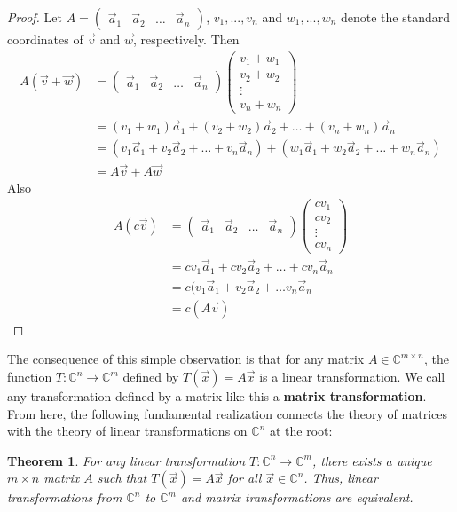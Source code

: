 \documentclass{article}
\theoremstyle{definition}
\theoremstyle{plain}
\theoremstyle{theorem}
\newtheorem{theorem}{Theorem}[section]
\begin{document}
\begin{proof}
	Let $A = \begin{pmatrix} \vec{a}_1 & \vec{a}_2 & \ldots & \vec{a}_n \end{pmatrix}$, $v_1,...,v_n$ and $w_1,...,w_n$ denote the standard coordinates of $\vec{v}$ and $\vec{w}$, respectively. Then
	\begin{align}
		A(\vec{v}+\vec{w}) &= \begin{pmatrix} \vec{a}_1 & \vec{a}_2 & \ldots & \vec{a}_n \end{pmatrix}\begin{pmatrix} v_1+w_1 \\ v_2+w_2 \\ \vdots \\ v_n+w_n \end{pmatrix} \\ &= (v_1+w_1)\vec{a}_1+(v_2+w_2)\vec{a}_2 + \ldots + (v_n+w_n)\vec{a}_n \\
		&= (v_1\vec{a}_1+v_2\vec{a}_2 + \ldots + v_n\vec{a}_n) + (w_1\vec{a}_1+w_2\vec{a}_2 + \ldots + w_n\vec{a}_n) \\
		&= A\vec{v} + A\vec{w}
	\end{align}
	Also
	\begin{align}
		A(c\vec{v}) &= \begin{pmatrix} \vec{a}_1 & \vec{a}_2 & \ldots & \vec{a}_n \end{pmatrix}\begin{pmatrix} cv_1 \\ cv_2 \\ \vdots \\ cv_n \end{pmatrix} \\ &= cv_1\vec{a}_1+cv_2\vec{a}_2 + \ldots + cv_n\vec{a}_n \\
		&= c(v_1\vec{a}_1 + v_2\vec{a}_2 + \ldots v_n\vec{a}_n \\
		&= c(A\vec{v})
	\end{align}
\end{proof}
The consequence of this simple observation is that for any matrix $A \in \mathbb{C}^{m \times n}$, the function $T:\mathbb{C}^n \to \mathbb{C}^m$ defined by $T(\vec{x}) = A\vec{x}$ is a linear transformation. We call any transformation defined by a matrix like this a \textbf{matrix transformation}. From here, the following fundamental realization connects the theory of matrices with the theory of linear transformations on $\mathbb{C}^n$ at the root:
\begin{theorem}
	For any linear transformation $T:\mathbb{C}^n \to \mathbb{C}^m$, there exists a unique $m \times n$ matrix $A$ such that $T(\vec{x}) = A\vec{x}$ for all $\vec{x} \in \mathbb{C}^n$. Thus, linear transformations from $\mathbb{C}^n$ to $\mathbb{C}^m$ and matrix transformations are \textit{equivalent}.
\end{theorem}
\end{document}
